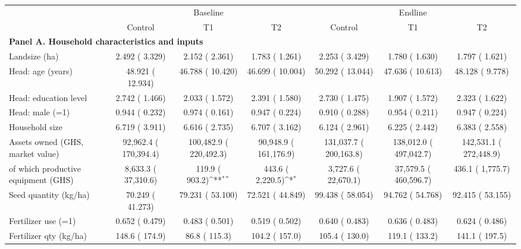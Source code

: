 \def\sym#1{\ifmmode^{#1}\else\(^{#1}\)\fi}
\begin{tabular}{lcccccc}
\toprule
 & \multicolumn{3}{c}{Baseline} & \multicolumn{3}{c}{Endline} \\
\cmidrule(lr){2-4}\cmidrule(lr){5-7}
 & Control & T1 & T2 & Control & T1 & T2 \\
\midrule
\multicolumn{7}{l}{\textbf{Panel A. Household characteristics and inputs}} \\
Landsize (ha) &     2.492 (    3.329) &     2.152 (    2.361) &     1.783 (    1.261) &     2.253 (    3.429) &     1.780 (    1.630) &     1.797 (    1.621) \\
Head: age (years) &    48.921 (   12.934) &    46.788 (   10.420) &    46.699 (   10.004) &    50.292 (   13.044) &    47.636 (   10.613) &    48.128 (    9.778) \\
Head: education level &     2.742 (    1.466) &     2.033 (    1.572) &     2.391 (    1.580) &     2.730 (    1.475) &     1.907 (    1.572) &     2.323 (    1.622) \\
Head: male (=1) &     0.944 (    0.232) &     0.974 (    0.161) &     0.947 (    0.224) &     0.910 (    0.288) &     0.954 (    0.211) &     0.947 (    0.224) \\
Household size &     6.719 (    3.911) &     6.616 (    2.735) &     6.707 (    3.162) &     6.124 (    2.961) &     6.225 (    2.442) &     6.383 (    2.558) \\
Assets owned (GHS, market value) &     92,962.4 (   170,394.4) &    100,482.9 (   220,492.3) &     90,948.9 (   161,176.9) &    131,037.7 (   200,163.8) &    138,012.0 (   497,042.7) &    142,531.1 (   272,448.9) \\
\quad of which productive equipment (GHS) &      8,633.3 (    37,310.6) &        119.9 (       903.2)\sym{**} &        443.6 (     2,220.5)\sym{*} &      3,727.6 (    22,670.1) &     37,579.5 (   460,596.7) &        436.1 (     1,775.7) \\
Seed quantity (kg/ha) &    70.249 (   41.273) &    79.231 (   53.100) &    72.521 (   44.849) &    99.438 (   58.054) &    94.762 (   54.768) &    92.415 (   53.155) \\
Fertilizer use (=1) &     0.652 (    0.479) &     0.483 (    0.501) &     0.519 (    0.502) &     0.640 (    0.483) &     0.636 (    0.483) &     0.624 (    0.486) \\
Fertilizer qty (kg/ha) &        148.6 (       174.9) &         86.8 (       115.3) &        104.2 (       157.0) &        105.4 (       130.0) &        119.1 (       133.2) &        141.1 (       197.5) \\

\end{tabular}
